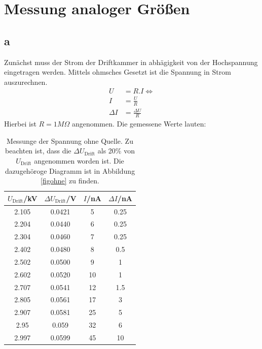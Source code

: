 \documentclass[12pt,ngerman]{article}
\begin{document}
	\tableofcontents
	\newpage
	\section{Messung analoger Größen}
	\subsection{a}
Zunächst muss der Strom der Driftkammer in abhägigkeit von der Hochspannung eingetragen werden. Mittels ohmsches Gesetzt ist die Spannung in Strom auszurechnen. 
\begin{align*}
U&=R.I \Leftrightarrow\\
I&=\frac{U}{R}\\
\Delta I&=\frac{\Delta U}{R}
\end{align*}
Hierbei ist $R=1M\Omega$ angenommen.
Die gemessene Werte lauten:
\begin{table}[h]
	\centering
	\begin{tabular}{c c c c}
	$U_{\text{Drift}}$/kV& $\Delta U_{\text{Drift}}$/V&$I$/nA&$\Delta I$/nA\\\hline
	2.105&	0.0421&	5&	0.25\\
	2.204&	0.0440&	6&	0.25\\
	2.304&	0.0460&	7&	0.25\\
	2.402&	0.0480&	8&	0.5\\
	2.502&	0.0500&	9&	1\\
	2.602&	0.0520&	10&	1\\
	2.707&	0.0541&	12&	1.5\\
	2.805&	0.0561&	17&	3\\
	2.907&	0.0581&	25&	5\\
	2.95&	0.059&	32&	6\\
	2.997&	0.0599&	45&	10\\
	\end{tabular}
	 \caption{Messunge der Spannung ohne Quelle. Zu beachten ist, dass die $\Delta U_{\text{Drift}}$ als 20\% von $U_{\text{Drift}}$ angenommen worden ist. Die dazugehöroge Diagramm ist in Abbildung \ref{figohne} zu finden.}
\end{table}
\end{document}
